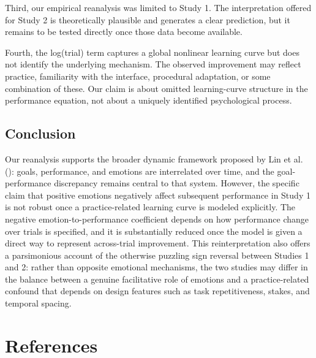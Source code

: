 \documentclass[
  man,
  floatsintext,
  longtable,
  nolmodern,
  notxfonts,
  notimes,
  colorlinks=true,linkcolor=blue,citecolor=blue,urlcolor=blue]{apa7}
\begin{document}
Third, our empirical reanalysis was limited to Study 1. The
interpretation offered for Study 2 is theoretically plausible and
generates a clear prediction, but it remains to be tested directly once
those data become available.

Fourth, the log(trial) term captures a global nonlinear learning curve
but does not identify the underlying mechanism. The observed improvement
may reflect practice, familiarity with the interface, procedural
adaptation, or some combination of these. Our claim is about omitted
learning-curve structure in the performance equation, not about a
uniquely identified psychological process.

\subsection{Conclusion}\label{conclusion}

Our reanalysis supports the broader dynamic framework proposed by Lin et
al. (): goals, performance, and
emotions are interrelated over time, and the goal-performance
discrepancy remains central to that system. However, the specific claim
that positive emotions negatively affect subsequent performance in Study
1 is not robust once a practice-related learning curve is modeled
explicitly. The negative emotion-to-performance coefficient depends on
how performance change over trials is specified, and it is substantially
reduced once the model is given a direct way to represent across-trial
improvement. This reinterpretation also offers a parsimonious account of
the otherwise puzzling sign reversal between Studies 1 and 2: rather
than opposite emotional mechanisms, the two studies may differ in the
balance between a genuine facilitative role of emotions and a
practice-related confound that depends on design features such as task
repetitiveness, stakes, and temporal spacing.

\section{References}\label{references}
\end{document}
